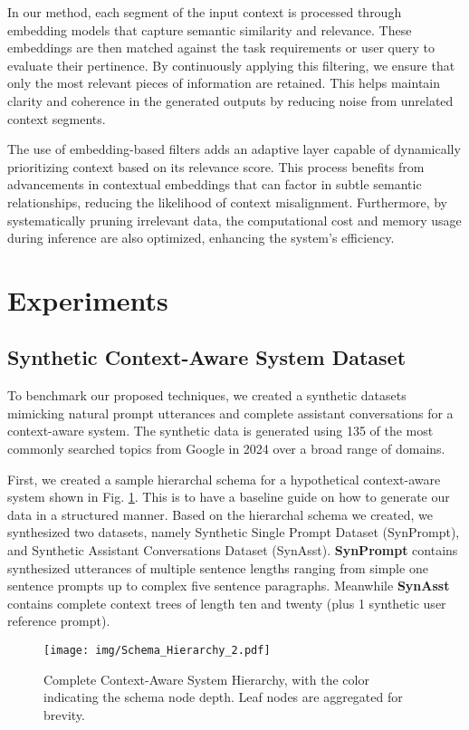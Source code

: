 In our method, each segment of the input context is processed through embedding models that capture semantic similarity and relevance. These embeddings are then matched against the task requirements or user query to evaluate their pertinence. By continuously applying this filtering, we ensure that only the most relevant pieces of information are retained. This helps maintain clarity and coherence in the generated outputs by reducing noise from unrelated context segments.

The use of embedding-based filters adds an adaptive layer capable of dynamically prioritizing context based on its relevance score. This process benefits from advancements in contextual embeddings that can factor in subtle semantic relationships, reducing the likelihood of context misalignment. Furthermore, by systematically pruning irrelevant data, the computational cost and memory usage during inference are also optimized, enhancing the system’s efficiency.

\section{Experiments}

\subsection{Synthetic Context-Aware System Dataset}
To benchmark our proposed techniques, we created a synthetic datasets mimicking natural prompt utterances and complete assistant conversations for a context-aware system. The synthetic data is generated using 135 of the most commonly searched topics from Google in 2024 over a broad range of domains. 

First, we created a sample hierarchal schema for a hypothetical context-aware system shown in Fig. \ref{fig:complete_hierarchy}. This is to have a baseline guide on how to generate our data in a structured manner. Based on the hierarchal schema we created, we synthesized two datasets, namely Synthetic Single Prompt Dataset (SynPrompt), and Synthetic Assistant Conversations Dataset (SynAsst). \textbf{SynPrompt} contains synthesized utterances of multiple sentence lengths ranging from simple one sentence prompts up to complex five sentence paragraphs. Meanwhile \textbf{SynAsst} contains complete context trees of length ten and twenty (plus 1 synthetic user reference prompt).

\begin{figure}[h]
\centering
\texttt{[image: img/Schema\_Hierarchy\_2.pdf]}
\caption{Complete Context-Aware System Hierarchy, with the color indicating the schema node depth. Leaf nodes are aggregated for brevity.}
\label{fig:complete_hierarchy}
\end{figure}

